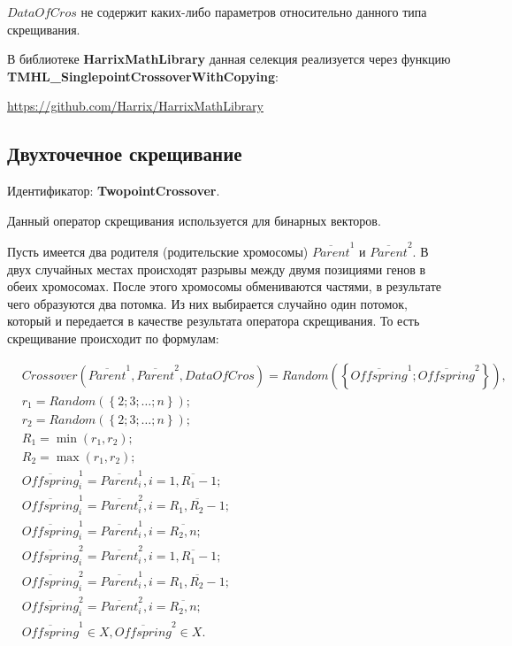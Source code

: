 \documentclass[a4paper,12pt]{article}
\begin{document}
$ DataOfCros $ не содержит каких-либо параметров относительно данного типа скрещивания.

В библиотеке \textbf{HarrixMathLibrary} данная селекция реализуется через функцию \textbf{TMHL\_SinglepointCrossoverWithCopying}:

\href{https://github.com/Harrix/HarrixMathLibrary}{https://github.com/Harrix/HarrixMathLibrary}

\subsection{Двухточечное скрещивание}\label{SetOfOperatorsAlgorithms:TwopointCrossover}

Идентификатор: \textbf{TwopointCrossover}.

Данный оператор скрещивания используется для бинарных векторов.

Пусть имеется два родителя (родительские хромосомы) $\overline{Parent}^1$ и $\overline{Parent}^2$. В двух случайных местах происходят разрывы между двумя позициями генов в обеих хромосомах. После этого хромосомы обмениваются частями, в результате чего образуются два потомка. Из них выбирается случайно один потомок, который и передается в качестве результата оператора скрещивания. То есть скрещивание происходит по формулам:

\begin{align}
\label{SetOfOperatorsAlgorithms:eq:TwopointCrossover}
&Crossover \left( \overline{Parent}^1, \overline{Parent}^2, DataOfCros\right)=Random \left(\left\lbrace \overline{Offspring}^1; \overline{Offspring}^2\right\rbrace  \right), \\
&r_1=Random\left( \left\lbrace 2; 3; \ldots; n\right\rbrace \right); \nonumber \\
&r_2=Random\left( \left\lbrace 2; 3; \ldots; n\right\rbrace \right); \nonumber \\
&R_1=\min \left( r_1, r_2\right) ; \nonumber \\
&R_2=\max \left( r_1, r_2\right) ; \nonumber \\
& \overline{Offspring}^1_i=\overline{Parent}^1_i, i=\overline{1,R_1-1};\nonumber\\
& \overline{Offspring}^1_i=\overline{Parent}^2_i, i=\overline{R_1,R_2-1};\nonumber\\
&  \overline{Offspring}^1_i=\overline{Parent}^1_i, i=\overline{R_2,n};\nonumber\\
& \overline{Offspring}^2_i=\overline{Parent}^2_i, i=\overline{1,R_1-1};\nonumber\\
& \overline{Offspring}^2_i=\overline{Parent}^1_i, i=\overline{R_1,R_2-1};\nonumber\\
&  \overline{Offspring}^2_i=\overline{Parent}^2_i, i=\overline{R_2,n};\nonumber\\
&\overline{Offspring}^1\in X, \overline{Offspring}^2\in X.\nonumber
\end{align}
\end{document}
